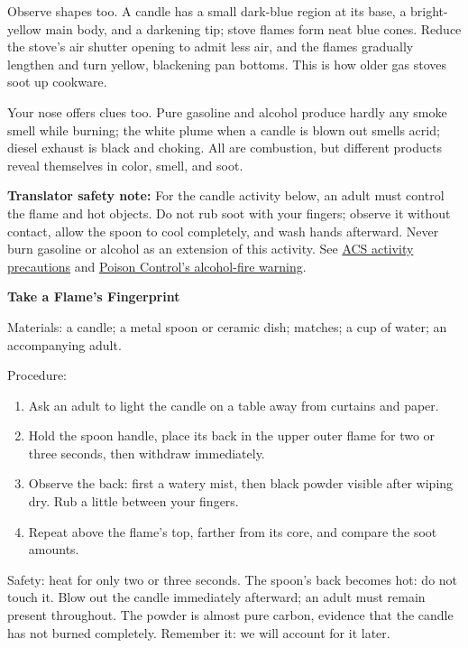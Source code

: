 Observe shapes too. A candle has a small dark-blue region at its base, a bright-yellow main body, and a darkening tip; stove flames form neat blue cones. Reduce the stove's air shutter opening to admit less air, and the flames gradually lengthen and turn yellow, blackening pan bottoms. This is how older gas stoves soot up cookware.

Your nose offers clues too. Pure gasoline and alcohol produce hardly any smoke smell while burning; the white plume when a candle is blown out smells acrid; diesel exhaust is black and choking. All are combustion, but different products reveal themselves in color, smell, and soot.

\textbf{Translator safety note:} For the candle activity below, an adult must control the flame and hot objects. Do not rub soot with your fingers; observe it without contact, allow the spoon to cool completely, and wash hands afterward. Never burn gasoline or alcohol as an extension of this activity. See \href{https://www.acs.org/education/celebrating-chemistry-editions/2024-ccew/science-safety-tips.html}{ACS activity precautions} and \href{https://www.poison.org/articles/rubbing-alcohol-only-looks-like-water}{Poison Control's alcohol-fire warning}.

\begin{shiyan}
\textbf{Take a Flame's Fingerprint}

Materials: a candle; a metal spoon or ceramic dish; matches; a cup of water; an accompanying adult.

Procedure:
\begin{enumerate}[itemsep=1pt]
\item Ask an adult to light the candle on a table away from curtains and paper.
\item Hold the spoon handle, place its back in the upper outer flame for two or three seconds, then withdraw immediately.
\item Observe the back: first a watery mist, then black powder visible after wiping dry. Rub a little between your fingers.
\item Repeat above the flame's top, farther from its core, and compare the soot amounts.
\end{enumerate}

Safety: heat for only two or three seconds. The spoon's back becomes hot: do not touch it. Blow out the candle immediately afterward; an adult must remain present throughout. The powder is almost pure carbon, evidence that the candle has not burned completely. Remember it: we will account for it later.
\end{shiyan}

